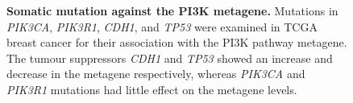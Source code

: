 \begin{figure}[!ht]
\begin{center}
    \end{center}
    \caption[Somatic \gls{mutation} against the PI3K \gls{metagene}]{\small \textbf{Somatic \gls{mutation} against the \gls{PI3K} \gls{metagene}.} Mutations in \textit{PIK3CA}, \textit{PIK3R1}, \textit{CDH1}, and \textit{TP53} were examined in \gls{TCGA} breast cancer for their association with the \gls{PI3K} \citep{Gatza2011} pathway \gls{metagene}. The \glspl{tumour suppressor} \textit{CDH1} and \textit{TP53} showed an increase and decrease in the \gls{metagene} respectively, whereas \textit{PIK3CA} and \textit{PIK3R1} \glspl{mutation} had little effect on the \gls{metagene} levels.
}
\label{fig:mutation_expr_mg}
\end{figure}

